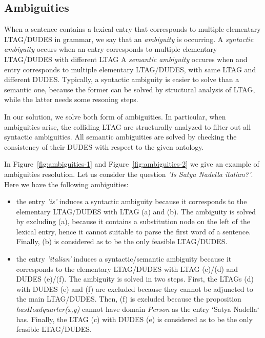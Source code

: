 \subsection{Ambiguities}
\label{sec:parsing-ambiguities}

When a sentence contains a lexical entry that corresponds to multiple elementary LTAG/DUDES in grammar, we say that an \textit{ambiguity} is occurring.
%
A \textit{syntactic ambiguity} occurs when an entry corresponds to multiple elementary LTAG/DUDES with different LTAG
%
A \textit{semantic ambiguity} occures when and entry corresponds to multiple elementary LTAG/DUDES, with same LTAG and different DUDES.
%
Typically, a syntactic ambiguity is easier to solve than a semantic one, because the former can be solved by structural analysis of LTAG, while the latter needs some resoning steps.

In our solution, we solve both form of ambiguities.
%
In particular, when ambiguities arise, the colliding LTAG are structurally analyzed to filter out all syntactic ambiguities.
%
All semantic ambiguities are solved by checking the consistency of their DUDES with respect to the given ontology.

In Figure~\ref{fig:ambiguities-1} and Figure~\ref{fig:ambiguities-2} we give an example of ambiguities resolution.
%
Let us consider the question \textit{'Is Satya Nadella italian?'}. Here we have the following ambiguities:

\begin{itemize}
\item the entry \textit{'is'} induces a syntactic ambiguity because it corresponds to the elementary LTAG/DUDES with LTAG (a) and (b).
%
The ambiguity is solved by excluding (a), because it contains a substitution node on the left of the lexical entry, hence it cannot suitable to parse the first word of a sentence. 
%
Finally, (b) is considered as to be the only feasible LTAG/DUDES.

\item the entry \textit{'italian'} induces a syntactic/semantic ambiguity because it corresponds to the elementary LTAG/DUDES with LTAG (c)/(d) and DUDES (e)/(f).
%
The ambiguity is solved in two steps.
%
First, the LTAGs (d) with DUDES (e) and (f) are excluded because they cannot be adjuncted to the main LTAG/DUDES.
%
Then, (f) is excluded because the proposition \textit{hasHeadquarter(x,y)} cannot have domain \textit{Person} as the entry `Satya Nadella` has.
%
Finally, the LTAG (c) with DUDES (e) is considered as to be the only feasible LTAG/DUDES.
\end{itemize}

